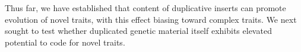


Thus far, we have established that content of duplicative inserts can promote evolution of novel traits, with this effect biasing toward complex traits.
We next sought to test whether duplicated genetic material itself exhibits elevated potential to code for novel traits.

